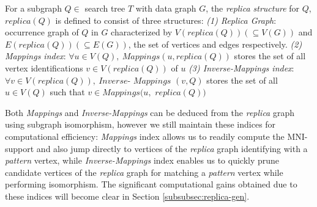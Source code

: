 \begin{defn}
	For a subgraph $Q \in $ search tree $T$ with data graph $G$, the
	\emph{replica structure} for $Q$, $replica(Q)$ is defined to consist of
	three structures: \newline
	\emph{(1) Replica Graph}: occurrence graph of $Q$ in $G$ characterized by
	$V(replica(Q)) (\subseteq V(G))$ and $E(replica(Q))(\subseteq E(G))$, the set of vertices and edges respectively.
	\newline
	\emph{(2) Mappings index}: $\forall u \in
	V(Q),\ Mappings(u, replica(Q))$ stores the set of all vertex identifications
	$v\in V(replica(Q))$ of $u$ \newline
	\emph{(3) Inverse-Mappings index}: $\forall v \in V(replica(Q)),\ Inverse$- $Mappings$ $(v, Q)$ stores the set of all $u\in V(Q)$ such
	that $v\in Mappings(u,$ $replica(Q))$
\end{defn}
 {\raggedleft \textnormal{Both}}
\emph{Mappings} and \emph{Inverse-Mappings} can be deduced from the \emph{replica}
graph using subgraph isomorphism, however we still maintain these indices for
computational efficiency: \emph{Mappings} index allows us to readily compute the
MNI-support and also jump directly to vertices of the \emph{replica} graph
identifying with a \emph{pattern} vertex, while \emph{Inverse-Mappings} index
enables us to quickly prune candidate vertices of the \emph{replica} graph for
matching a \emph{pattern} vertex while performing isomorphism. The significant
computational gains obtained due to these indices will become clear in
Section \ref{subsubsec:replica-gen}.


